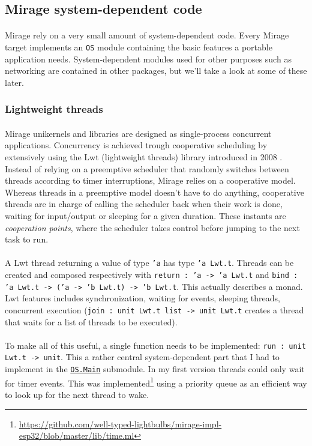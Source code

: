 \documentclass[a4paper]{article}
\begin{document}
\subsection{Mirage system-dependent code}
\paragraph{}
Mirage rely on a very small amount of system-dependent code. Every Mirage target implements an \texttt{OS} module containing the basic features a portable application needs. System-dependent modules used for other purposes such as networking are contained in other packages, but we'll take a look at some of these later. 

\subsubsection{Lightweight threads}
\paragraph{}
Mirage unikernels and libraries are designed as single-process concurrent applications. Concurrency is 
achieved trough cooperative scheduling by extensively using the Lwt (lightweight threads) library introduced in 2008 \cite{vouillon2008lwt}. Instead of relying on a preemptive scheduler that randomly switches between threads according to timer interruptions, Mirage relies on a cooperative model. Whereas threads in a preemptive model doesn't have to do anything, cooperative threads are in charge of calling the scheduler back when their work is done, waiting for input/output or sleeping for a given duration. These instants are \textit{cooperation points}, where the scheduler takes control before jumping to the next task to run.
\paragraph{}
A Lwt thread returning a value of type \texttt{'a} has type \texttt{'a Lwt.t}. Threads can be created and composed respectively with \texttt{return : 'a -> 'a Lwt.t} and \texttt{bind : 'a Lwt.t -> ('a -> 'b Lwt.t) -> 'b Lwt.t}. This actually describes a monad. Lwt features includes synchronization, waiting for events, sleeping threads, concurrent execution (\texttt{join : unit Lwt.t list -> unit Lwt.t} creates a thread that waits for
a list of threads to be executed).
\paragraph{}
To make all of this useful, a single function needs to be implemented: \texttt{run : unit Lwt.t -> unit}. 
This a rather central system-dependent part that I had to implement in the \href{https://github.com/well-typed-lightbulbs/mirage-impl-esp32/blob/master/lib/main.ml}{\texttt{OS.Main}} submodule. In my first version threads could only wait for timer events. This was implemented\footnote{\url{https://github.com/well-typed-lightbulbs/mirage-impl-esp32/blob/master/lib/time.ml}} using a priority queue as an efficient way to look up for the next thread to wake. 
\end{document}
